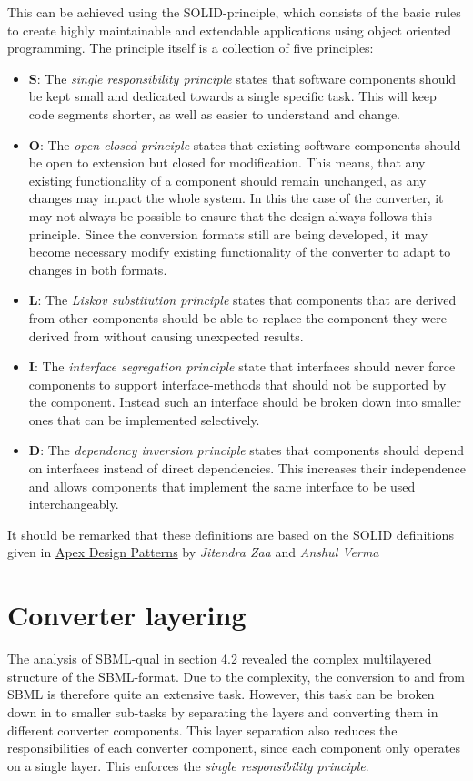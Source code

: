 This can be achieved using the SOLID-principle, which consists of the basic rules to create highly maintainable and extendable applications using object oriented programming. The principle itself is a collection of five principles:
\begin{itemize}
    \item \textbf{S}: The \textit{single responsibility principle} states that software components should be kept small and dedicated towards a single specific task. This will keep code segments shorter, as well as easier to understand and change.
    \item \textbf{O}: The \textit{open-closed principle} states that existing software components should be open to extension but closed for modification. This means, that any existing functionality of a component should remain unchanged, as any changes may impact the whole system. In this the case of the converter, it may not always be possible to ensure that the design always follows this principle. Since the conversion formats still are being developed, it may become necessary modify existing functionality of the converter to adapt to changes in both formats.
    \item \textbf{L}: The \textit{Liskov substitution principle} states that components that are derived from other components should be able to replace the component they were derived from without causing unexpected results.
    \item \textbf{I}: The \textit{interface segregation principle} state that interfaces should never force components to support interface-methods that should not be supported by the component. Instead such an interface should be broken down into smaller ones that can be implemented selectively.
    \item \textbf{D}: The \textit{dependency inversion principle} states that components should depend on interfaces instead of direct dependencies. This increases their independence and allows components that implement the same interface to be used interchangeably.
\end{itemize}

It should be remarked that these definitions are based on the SOLID definitions given in \href{https://learning.oreilly.com/library/view/apex-design-patterns/9781782173656/ch01s10.html#ch01lvl2sec8}{Apex Design Patterns} by \emph{Jitendra Zaa} and \emph{Anshul Verma}

\section{Converter layering}
The analysis of SBML-qual in section 4.2 revealed the complex multilayered structure of the SBML-format. Due to the complexity, the conversion to and from SBML is therefore quite an extensive task. However, this task can be broken down in to smaller sub-tasks by separating the layers and converting them in different converter components. This layer separation also reduces the responsibilities of each converter component, since each component only operates on a single layer. This enforces the \emph{single responsibility principle}.

